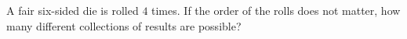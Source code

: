 A fair six-sided die is rolled $4$ times. If the order of the rolls does not matter, how many different collections of results are possible?
